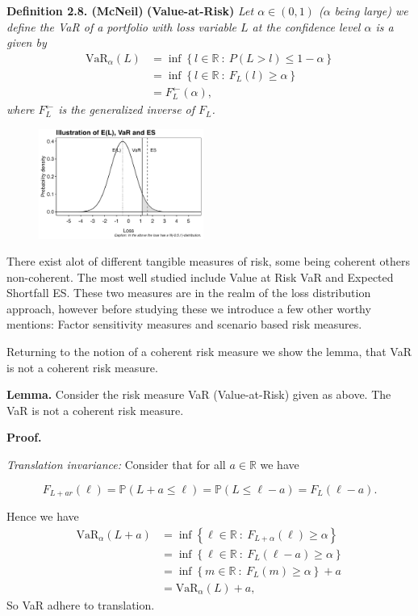 \documentclass[a4paper,12pt,openany]{book}
\begin{document}
\textbf{Definition 2.8. (McNeil)} \textbf{(Value-at-Risk)} \emph{Let \(\alpha\in (0,1)\) (\(\alpha\) being large) we define the VaR of a portfolio with loss variable \(L\) at the confidence level \(\alpha\) is a given by}
\begin{align*}
\text{VaR}_\alpha(L)&=\inf\left\{ l\in\mathbb{R}\ :\ P(L>l)\le 1-\alpha \right\}\\
&=\inf\left\{ l\in\mathbb{R}\ :\ F_L(l)\ge \alpha \right\}\\
&=F^{\leftarrow}_L(\alpha),
\end{align*}
\emph{where \(F^{\leftarrow}_L\) is the generalized inverse of \(F_L\).}

\begin{figure}
  \begin{center}
    \includegraphics[width=0.48\textwidth]{figures/VaR_ES.png}
  \end{center}
\end{figure}

There exist alot of different tangible measures of risk, some being coherent others non-coherent. The most well studied include Value at Risk VaR and Expected Shortfall ES. These two measures are in the realm of the loss distribution approach, however before studying these we introduce a few other worthy mentions: Factor sensitivity measures and scenario based risk measures.

Returning to the notion of a coherent risk measure we show the lemma, that VaR is not a coherent risk measure.

\textbf{Lemma.} Consider the risk measure VaR (Value-at-Risk) given as above. The VaR is not a coherent risk measure.

\textbf{Proof.}

\emph{Translation invariance:} Consider that for all \(a\in\mathbb R\) we have

\[
F_{L+ar}(\ell)=\mathbb P(L+a\le \ell)=\mathbb P(L\le\ell - a)=F_L(\ell-a).
\]

Hence we have
\begin{align*}
\text{VaR}_\alpha(L+a)&=\inf\left\{ \ell\in\mathbb{R}\ :\ F_{L+\alpha}(\ell)\ge \alpha \right\}\\
&=\inf\left\{ \ell\in\mathbb{R}\ :\ F_{L}(\ell-a)\ge \alpha \right\}\\
&=\inf\left\{ m\in\mathbb{R}\ :\ F_{L}(m)\ge \alpha \right\}+a\\
&=\text{VaR}_\alpha(L)+a,
\end{align*}
So VaR adhere to translation.
\end{document}
